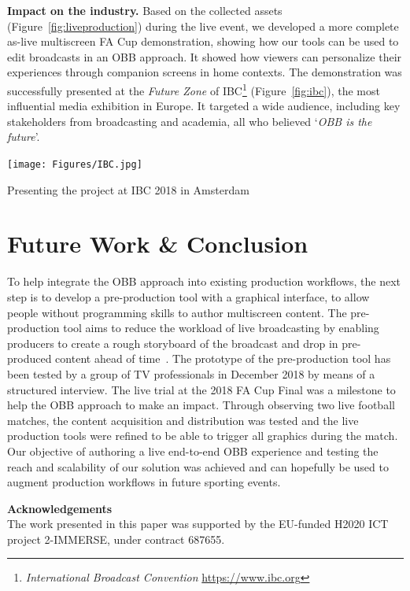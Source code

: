\documentclass[sigchi-a, authorversion]{acmart}
\begin{document}
\vspace{5pt}\noindent\textbf{Impact on the industry.} Based on the collected assets
(Figure~\ref{fig:liveproduction}) during the live event, we developed a more complete as-live multiscreen
FA Cup demonstration, showing how our tools can be used to edit broadcasts
in an OBB approach. It showed how viewers can personalize their experiences
through companion screens in home contexts. The demonstration was successfully
presented at the \emph{Future Zone} of IBC\footnote{\emph{International Broadcast Convention} \url{https://www.ibc.org}} (Figure~\ref{fig:ibc}), the most
influential media exhibition in Europe. It targeted a wide audience, including
key stakeholders from broadcasting and academia, all who believed `\emph{OBB is the future}'.

\begin{marginfigure}
    \vspace{3pc}
    \hspace*{-1cm}
    \texttt{[image: Figures/IBC.jpg]}
    \caption{Presenting the project at IBC 2018 in Amsterdam}
    \label{fig:ibc}
\end{marginfigure}

\section{Future Work \& Conclusion}

To help integrate the OBB approach into existing production workflows, the next
step is to develop a pre-production tool with a graphical interface, to allow
people without programming skills to author multiscreen content. The pre-production
tool aims to reduce the workload of live broadcasting by enabling producers to
create a rough storyboard of the broadcast and drop in pre-produced content ahead
of time~\cite{Li:2018_TVX}. The prototype of the pre-production tool has been
tested by a group of TV professionals in December 2018 by means of a structured interview. The live trial at
the 2018 FA Cup Final was a milestone to help the OBB approach to make an impact.
Through observing two live football matches, the content acquisition and distribution
was tested and the live production tools were refined to be able to trigger all graphics during the match.
Our objective of authoring a live end-to-end OBB experience and testing the
reach and scalability of our solution was achieved and can hopefully be used to
augment production workflows in future sporting events.

\begin{sidebar}
    \vspace{2pc}
    \noindent\textbf{Acknowledgements}\\
    \noindent The work presented in this paper was supported by the EU-funded
    H2020 ICT project 2-IMMERSE, under contract 687655.
\end{sidebar}



\end{document}
